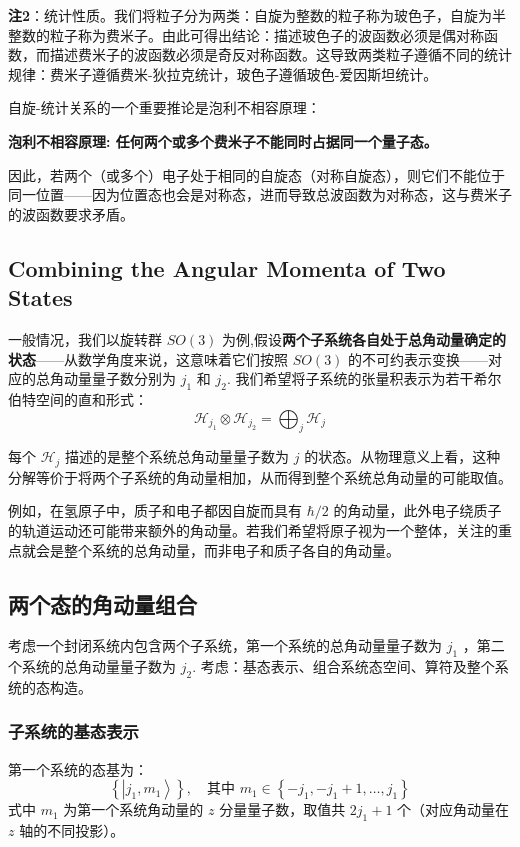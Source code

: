 \textbf{注2}：统计性质。我们将粒子分为两类：自旋为整数的粒子称为玻色子，自旋为半整数的粒子称为费米子。由此可得出结论：描述玻色子的波函数必须是偶对称函数，而描述费米子的波函数必须是奇反对称函数。这导致两类粒子遵循不同的统计规律：费米子遵循费米-狄拉克统计，玻色子遵循玻色-爱因斯坦统计。

自旋-统计关系的一个重要推论是泡利不相容原理：

\textbf{泡利不相容原理: 任何两个或多个费米子不能同时占据同一个量子态。 }

因此，若两个（或多个）电子处于相同的自旋态（对称自旋态），则它们不能位于同一位置——因为位置态也会是对称态，进而导致总波函数为对称态，这与费米子的波函数要求矛盾。

\subsection{Combining the Angular Momenta of Two States}
一般情况，我们以旋转群 \(SO(3)\) 为例,假设\textbf{两个子系统各自处于总角动量确定的状态}——从数学角度来说，这意味着它们按照 \(SO(3)\) 的不可约表示变换——对应的总角动量量子数分别为 \(j_1\) 和 \(j_2\). 我们希望将子系统的张量积表示为若干希尔伯特空间的直和形式：
\begin{equation}
	\mathcal{H}_{j_1} \otimes \mathcal{H}_{j_2} = \bigoplus_j \mathcal{H}_j
\end{equation}

每个 \(\mathcal{H}_j\) 描述的是整个系统总角动量量子数为 \(j\) 的状态。从物理意义上看，这种分解等价于将两个子系统的角动量相加，从而得到整个系统总角动量的可能取值。

例如，在氢原子中，质子和电子都因自旋而具有 \(\hbar/2\) 的角动量，此外电子绕质子的轨道运动还可能带来额外的角动量。若我们希望将原子视为一个整体，关注的重点就会是整个系统的总角动量，而非电子和质子各自的角动量。
\subsection{ 两个态的角动量组合}
考虑一个封闭系统内包含两个子系统，第一个系统的总角动量量子数为 \(j_1\) ，第二个系统的总角动量量子数为 \(j_2\). 考虑：基态表示、组合系统态空间、算符及整个系统的态构造。


\subsubsection{ 子系统的基态表示}
第一个系统的态基为：
\begin{equation}
	\left\{ \left| j_1, m_1 \right> \right\}, \quad \text{其中 } m_1 \in \left\{ -j_1, -j_1+1, \dots, j_1 \right\} 
\end{equation}
式中 \(m_1\) 为第一个系统角动量的  \(z\)  分量量子数，取值共 \(2j_1+1\) 个（对应角动量在 \(z\) 轴的不同投影）。

